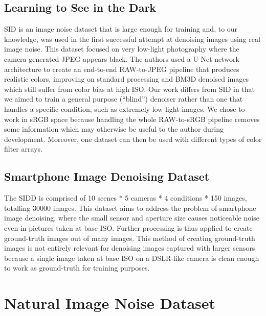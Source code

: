 \subsection{Learning to See in the Dark}
\acf{SID} is an image noise dataset that is large enough for training and, to our knowledge, was used in the first successful attempt at denoising images using real image noise. This dataset focused on very low-light photography where the camera-generated JPEG appears black. The authors used a U-Net network architecture to create an end-to-end RAW-to-JPEG pipeline that produces realistic colors, improving on standard processing and \acs{BM3D} denoised images which still suffer from color bias at high ISO. Our work differs from \ac{SID} in that we aimed to train a general purpose (``blind'') denoiser rather than one that handles a specific condition, such as extremely low light images. We chose to work in sRGB space because handling the whole RAW-to-sRGB pipeline removes some information which may otherwise be useful to the author during development. Moreover, one dataset can then be used with different types of color filter arrays.
\subsection{Smartphone Image Denoising Dataset}
The \acf{SIDD} is comprised of 10 scenes * 5 cameras * 4 conditions * 150 images, totalling 30000 images. This dataset aims to address the problem of smartphone image denoising, where the small sensor and aperture size causes noticeable noise even in pictures taken at base ISO. Further processing is thus applied to create ground-truth images out of many images. This method of creating ground-truth images is not entirely relevant for denoising images captured with larger sensors because a single image taken at base ISO on a DSLR-like camera is clean enough to work as ground-truth for training purposes.
%
\section{Natural Image Noise Dataset}\label{sec:Natural Image Noise Dataset}

